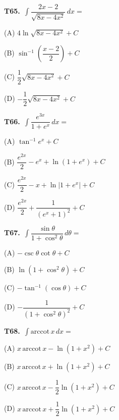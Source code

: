 \documentclass[11pt]{article}
\begin{document}
\bigskip\noindent\textbf{T65.}\ $\displaystyle\int \dfrac{2x-2}{\sqrt{8x-4x^2}}\,dx =$
\begin{list}{}{\setlength{\leftmargin}{3em}\setlength{\labelwidth}{2.5em}\setlength{\itemsep}{0pt}\setlength{\topsep}{2pt}}
\item[(A)] $4\ln\sqrt{8x-4x^2}+C$
\item[(B)] $\sin^{-1}\!\left(\dfrac{x-2}{2}\right)+C$
\item[(C)] $\dfrac{1}{2}\sqrt{8x-4x^2}+C$
\item[(D)] $-\dfrac{1}{2}\sqrt{8x-4x^2}+C$
\end{list}

\bigskip\noindent\textbf{T66.}\ $\displaystyle\int \dfrac{e^{3x}}{1+e^x}\,dx =$
\begin{list}{}{\setlength{\leftmargin}{3em}\setlength{\labelwidth}{2.5em}\setlength{\itemsep}{0pt}\setlength{\topsep}{2pt}}
\item[(A)] $\tan^{-1}e^x+C$
\item[(B)] $\dfrac{e^{2x}}{2}-e^x+\ln(1+e^x)+C$
\item[(C)] $\dfrac{e^{2x}}{2}-x+\ln|1+e^x|+C$
\item[(D)] $\dfrac{e^{2x}}{2}+\dfrac{1}{(e^x+1)^2}+C$
\end{list}

\bigskip\noindent\textbf{T67.}\ $\displaystyle\int \dfrac{\sin\theta}{1+\cos^2\theta}\,d\theta =$
\begin{list}{}{\setlength{\leftmargin}{3em}\setlength{\labelwidth}{2.5em}\setlength{\itemsep}{0pt}\setlength{\topsep}{2pt}}
\item[(A)] $-\csc\theta\cot\theta+C$
\item[(B)] $\ln(1+\cos^2\theta)+C$
\item[(C)] $-\tan^{-1}(\cos\theta)+C$
\item[(D)] $-\dfrac{1}{(1+\cos^2\theta)^2}+C$
\end{list}

\bigskip\noindent\textbf{T68.}\ $\displaystyle\int \text{arccot}\,x\,dx =$
\begin{list}{}{\setlength{\leftmargin}{3em}\setlength{\labelwidth}{2.5em}\setlength{\itemsep}{0pt}\setlength{\topsep}{2pt}}
\item[(A)] $x\,\text{arccot}\,x-\ln(1+x^2)+C$
\item[(B)] $x\,\text{arccot}\,x+\ln(1+x^2)+C$
\item[(C)] $x\,\text{arccot}\,x-\dfrac{1}{2}\ln(1+x^2)+C$
\item[(D)] $x\,\text{arccot}\,x+\dfrac{1}{2}\ln(1+x^2)+C$
\end{list}
\end{document}
